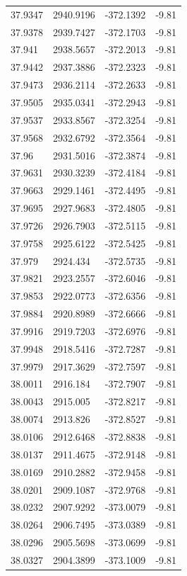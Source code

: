 \begin{table}[H]
\begin{tabular}{llll}
37.9347 & 2940.9196 & -372.1392 & -9.81 \\
37.9378 & 2939.7427 & -372.1703 & -9.81 \\
37.941 & 2938.5657 & -372.2013 & -9.81 \\
37.9442 & 2937.3886 & -372.2323 & -9.81 \\
37.9473 & 2936.2114 & -372.2633 & -9.81 \\
37.9505 & 2935.0341 & -372.2943 & -9.81 \\
37.9537 & 2933.8567 & -372.3254 & -9.81 \\
37.9568 & 2932.6792 & -372.3564 & -9.81 \\
37.96 & 2931.5016 & -372.3874 & -9.81 \\
37.9631 & 2930.3239 & -372.4184 & -9.81 \\
37.9663 & 2929.1461 & -372.4495 & -9.81 \\
37.9695 & 2927.9683 & -372.4805 & -9.81 \\
37.9726 & 2926.7903 & -372.5115 & -9.81 \\
37.9758 & 2925.6122 & -372.5425 & -9.81 \\
37.979 & 2924.434 & -372.5735 & -9.81 \\
37.9821 & 2923.2557 & -372.6046 & -9.81 \\
37.9853 & 2922.0773 & -372.6356 & -9.81 \\
37.9884 & 2920.8989 & -372.6666 & -9.81 \\
37.9916 & 2919.7203 & -372.6976 & -9.81 \\
37.9948 & 2918.5416 & -372.7287 & -9.81 \\
37.9979 & 2917.3629 & -372.7597 & -9.81 \\
38.0011 & 2916.184 & -372.7907 & -9.81 \\
38.0043 & 2915.005 & -372.8217 & -9.81 \\
38.0074 & 2913.826 & -372.8527 & -9.81 \\
38.0106 & 2912.6468 & -372.8838 & -9.81 \\
38.0137 & 2911.4675 & -372.9148 & -9.81 \\
38.0169 & 2910.2882 & -372.9458 & -9.81 \\
38.0201 & 2909.1087 & -372.9768 & -9.81 \\
38.0232 & 2907.9292 & -373.0079 & -9.81 \\
38.0264 & 2906.7495 & -373.0389 & -9.81 \\
38.0296 & 2905.5698 & -373.0699 & -9.81 \\
38.0327 & 2904.3899 & -373.1009 & -9.81 \\

\end{tabular}
\end{table}
